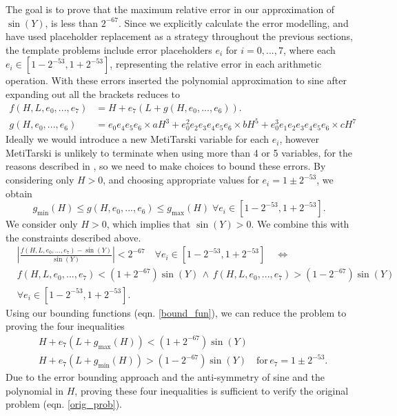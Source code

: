 \documentclass{fac}
\begin{document}
The goal is to prove that the maximum relative error in our approximation of $\sin{(Y)}$, is less than $2^{-67}$. Since we explicitly calculate the error modelling, and have used placeholder replacement as a strategy throughout the previous sections, the template problems include error placeholders $e_i$ for $i=0,...,7$, where each $e_i \in [1-2^{-53},1+2^{-53}]$, representing the relative error in each arithmetic operation. With these errors inserted the polynomial approximation to sine after expanding out all the brackets reduces to
\begin{align*}
    f(H,L, e_0,..., e_7) &= H + e_7(L + g(H, e_0,..., e_6)).\\
    g(H, e_0,..., e_6) &= e_0e_4e_5e_6\times aH^3 + e_0^2e_2e_3e_4e_5e_6\times bH^5 + e_0^3e_1e_2e_3e_4e_5e_6\times cH^7
\end{align*}
Ideally we would introduce a new MetiTarski variable for each $e_i$, however MetiTarski is unlikely to terminate when using more than 4 or 5 variables, for the reasons described in \cite{akbarpour2008metitarski}, so we need to make choices to bound these errors. By considering only $H>0$, and choosing appropriate values for $e_i=1\pm 2^{-53}$, we obtain 
\begin{equation} \label{bound_fun}
g_{\textrm{min}}(H) \leq g(H,e_0,...,e_6) \leq g_{\textrm{max}}(H) \; \forall e_i \in [1-2^{-53},1+2^{-53}].
\end{equation}
We consider only $H>0$, which implies that $\sin{(Y)}>0$. We combine this with the constraints described above. 
\begin{align}
    &\left|\frac{f(H,L, e_0,...,e_7)-\sin{(Y)}}{\sin{(Y)}}\right|<2^{-67} \quad \forall e_i \in [1-2^{-53},1+2^{-53}] \label{orig_prob} \quad \Leftrightarrow \\
    & f(H,L,e_0,...,e_7) < (1+2^{-67}) \sin{(Y)} \, \land \, f(H,L,e_0,...,e_7) > (1-2^{-67}) \sin{(Y)} 
    \\
    & \forall e_i \in [1-2^{-53},1+2^{-53}].
\end{align}
Using our bounding functions (eqn. \ref{bound_fun}), we can reduce the problem to proving the four inequalities
\begin{align}
    &H + e_7(L+g_{\textrm{max}}(H)) < (1+2^{-67}) \sin{(Y)}\label{upper_bound} \\
    &H + e_7(L+g_{\textrm{min}}(H)) > (1-2^{-67}) \sin{(Y)}\label{lower_bound} \quad \textrm{for}\,  e_7=1\pm2^{-53}.
\end{align}
Due to the error bounding approach and the anti-symmetry of sine and the polynomial in $H$, proving these four inequalities is sufficient to verify the original problem (eqn. \ref{orig_prob}).
\end{document}
